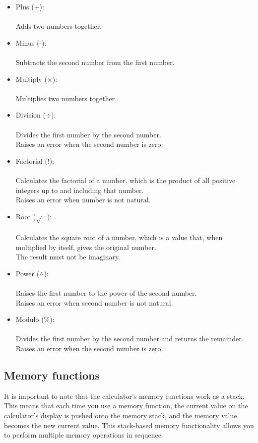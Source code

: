 \begin{itemize}
	\item Plus (+): \\\\
	Adds two numbers together.
	\item Minus (-): \\\\
	Subtracts the second number from the first number.
	\item Multiply ($\times$): \\\\
	Multiplies two numbers together.
	\item Division ($\div$): \\\\
	Divides the first number by the second number.\\
	Raises an error when the second number is zero.
	\item Factorial (!): \\\\
	Calculates the factorial of a number, which is the product of all positive integers up to and including that number.\\
	Raises an error when number is not natural.
	\item Root ($\sqrt{\phantom{x}}$): \\\\
	Calculates the square root of a number, which is a value that, when multiplied by itself, gives the original number. \\
	The result must not be imaginary.
	\item Power ($\wedge$): \\\\
	Raises the first number to the power of the second number. \\
	Raises an error when second number is not natural.
	\item Modulo (\%): \\\\
	Divides the first number by the second number and returns the remainder.\\
	Raises an error when the second number is zero.
	
\end{itemize}

\subsection{Memory functions}

It is important to note that the calculator's memory functions work as a stack. This means that each time you use a memory function, the current value on the calculator's display is pushed onto the memory stack, and the memory value becomes the new current value. This stack-based memory functionality allows you to perform multiple memory operations in sequence.

